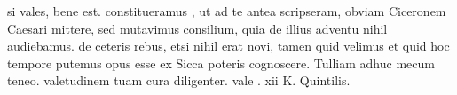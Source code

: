 


si vales, bene est. constitueramus , ut ad te antea scripseram, obviam Ciceronem Caesari mittere, sed mutavimus
consilium, quia de illius adventu nihil audiebamus. de ceteris rebus, etsi nihil erat novi, tamen quid velimus et quid hoc tempore putemus opus esse ex Sicca poteris cognoscere.  Tulliam adhuc mecum teneo. valetudinem tuam cura diligenter. vale . xii K. Quintilis.
